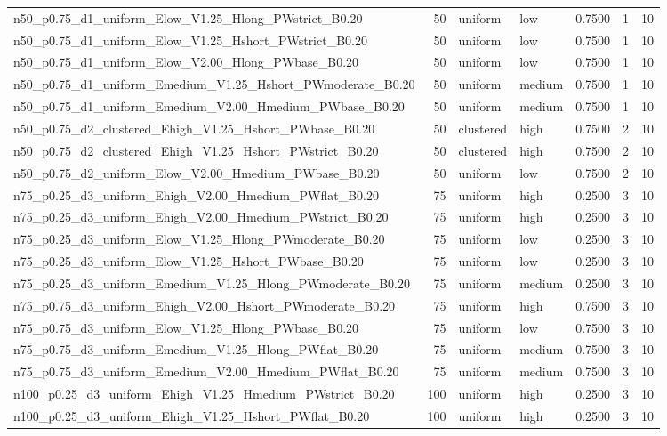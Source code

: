 \begin{tabular}{lrllrrr}
n50_p0.75_d1_uniform_Elow_V1.25_Hlong_PWstrict_B0.20 & 50 & uniform & low & 0.7500 & 1 & 10 \\
n50_p0.75_d1_uniform_Elow_V1.25_Hshort_PWstrict_B0.20 & 50 & uniform & low & 0.7500 & 1 & 10 \\
n50_p0.75_d1_uniform_Elow_V2.00_Hlong_PWbase_B0.20 & 50 & uniform & low & 0.7500 & 1 & 10 \\
n50_p0.75_d1_uniform_Emedium_V1.25_Hshort_PWmoderate_B0.20 & 50 & uniform & medium & 0.7500 & 1 & 10 \\
n50_p0.75_d1_uniform_Emedium_V2.00_Hmedium_PWbase_B0.20 & 50 & uniform & medium & 0.7500 & 1 & 10 \\
n50_p0.75_d2_clustered_Ehigh_V1.25_Hshort_PWbase_B0.20 & 50 & clustered & high & 0.7500 & 2 & 10 \\
n50_p0.75_d2_clustered_Ehigh_V1.25_Hshort_PWstrict_B0.20 & 50 & clustered & high & 0.7500 & 2 & 10 \\
n50_p0.75_d2_uniform_Elow_V2.00_Hmedium_PWbase_B0.20 & 50 & uniform & low & 0.7500 & 2 & 10 \\
n75_p0.25_d3_uniform_Ehigh_V2.00_Hmedium_PWflat_B0.20 & 75 & uniform & high & 0.2500 & 3 & 10 \\
n75_p0.25_d3_uniform_Ehigh_V2.00_Hmedium_PWstrict_B0.20 & 75 & uniform & high & 0.2500 & 3 & 10 \\
n75_p0.25_d3_uniform_Elow_V1.25_Hlong_PWmoderate_B0.20 & 75 & uniform & low & 0.2500 & 3 & 10 \\
n75_p0.25_d3_uniform_Elow_V1.25_Hshort_PWbase_B0.20 & 75 & uniform & low & 0.2500 & 3 & 10 \\
n75_p0.25_d3_uniform_Emedium_V1.25_Hlong_PWmoderate_B0.20 & 75 & uniform & medium & 0.2500 & 3 & 10 \\
n75_p0.75_d3_uniform_Ehigh_V2.00_Hshort_PWmoderate_B0.20 & 75 & uniform & high & 0.7500 & 3 & 10 \\
n75_p0.75_d3_uniform_Elow_V1.25_Hlong_PWbase_B0.20 & 75 & uniform & low & 0.7500 & 3 & 10 \\
n75_p0.75_d3_uniform_Emedium_V1.25_Hlong_PWflat_B0.20 & 75 & uniform & medium & 0.7500 & 3 & 10 \\
n75_p0.75_d3_uniform_Emedium_V2.00_Hmedium_PWflat_B0.20 & 75 & uniform & medium & 0.7500 & 3 & 10 \\
n100_p0.25_d3_uniform_Ehigh_V1.25_Hmedium_PWstrict_B0.20 & 100 & uniform & high & 0.2500 & 3 & 10 \\
n100_p0.25_d3_uniform_Ehigh_V1.25_Hshort_PWflat_B0.20 & 100 & uniform & high & 0.2500 & 3 & 10 \\

\end{tabular}
